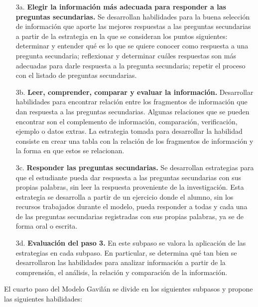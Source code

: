 \begin{itemize}
  \item [3a.] \textbf{Elegir la información más adecuada para responder a las preguntas secundarias.} Se desarrollan habilidades para la buena selección de información que aporte las mejores respuestas a las preguntas secundarias a partir de la estrategia en la que se consideran los puntos siguientes: determinar y entender qué es lo que se quiere conocer como respuesta a una pregunta secundaria; reflexionar y determinar cuáles respuestas son más adecuadas para darle respuesta a la pregunta secundaria; repetir el proceso con el listado de preguntas secundarias.
  \item [3b.] \textbf{Leer, comprender, comparar y evaluar la información.} Desarrollar habilidades para encontrar relación entre los fragmentos de información que dan respuesta a las preguntas secundarias. Algunas relaciones que se pueden encontrar son el complemento de información, comparación, verificación, ejemplo o datos extras.  La estrategia tomada para desarrollar la habilidad consiste en crear una tabla con la relación de los fragmentos de información y la forma en que estos se relacionan.
  \item [3c.] \textbf{Responder las preguntas secundarias.} Se desarrollan estrategias para que el estudiante pueda dar respuesta a las preguntas secundarias con sus propias palabras, sin leer la respuesta proveniente de la investigación. Esta estrategia se desarrolla a partir de un ejercicio donde el alumno, sin los recursos trabajados durante el modelo, pueda responder a todas y cada una de las preguntas secundarias registradas con sus propias palabras, ya se de forma oral o escrita.
  \item [3d.] \textbf{Evaluación del paso 3.} En este subpaso se valora la aplicación de las estrategias en cada subpaso. En particular, se determina qué tan bien se desarrollaron las habilidades para analizar información a partir de la comprensión, el análisis, la relación y comparación de la información.
\end{itemize}

El cuarto paso del Modelo Gavilán se divide en los siguientes subpasos y propone las siguientes habilidades:

